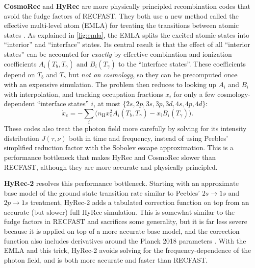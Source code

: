 \documentclass[USenglish, thumbmarks]{uiophdthesis} %
\newcommand\Hy{\ensuremath{\mathrm{H}}} %
\begin{document}
\textbf{CosmoRec} \cite{chlubaCompleteTreatmentCosmological2010} and
\textbf{HyRec} \cite{ali-haimoudHyRecFastHighly2011a}
are more physically principled recombination codes that avoid the fudge factors of RECFAST.
They both use a new method called the effective multi-level atom (EMLA)
for treating the transitions between atomic states
\cite{ali-haimoudUltrafastEffectiveMultilevel2010}.
As explained in \cref{fig:emla}, the EMLA splits the excited atomic states into \enquote{interior} and \enquote{interface} states.
Its central result is that the effect of all \enquote{interior states}
can be accounted for \emph{exactly} by effective combination and ionization coefficients $A_i(T_b, T_\gamma)$ and $B_i(T_\gamma)$
to the \enquote{interface states}.
These coefficients depend on $T_b$ and $T_\gamma$ but \emph{not on cosmology},
so they can be precomputed once with an expensive simulation.
The problem then reduces to looking up $A_i$ and $B_i$ with interpolation,
and tracking occupation fractions $x_i$ for only a few cosmology-dependent \enquote{interface states} $i$,
at most $\{2s, 2p, 3s, 3p, 3d, 4s, 4p, 4d\}$:
\begin{equation}
\dot{x}_e = -\sum_i \big( n_\Hy x_e^2 A_i(T_b, T_\gamma) - x_i B_i(T_\gamma) \big) .
\label{eq:hyrec}
\end{equation}
These codes also treat the photon field more carefully
by solving for its intensity distribution $J(\tau, \nu)$ both in time and frequency,
instead of using Peebles' simplified reduction factor with the Sobolev escape approximation.
This is a performance bottleneck that makes HyRec and CosmoRec slower than RECFAST,
although they are more accurate and physically principled.

\textbf{HyRec-2} \cite{leeHYREC2HighlyAccurate2020}
resolves this performance bottleneck.
Starting with an approximate base model of the ground state transition rate
similar to Peebles' $2s \to 1s$ and $2p \to 1s$ treatment,
HyRec-2 adds a tabulated correction function on top from an accurate (but slower) full HyRec simulation.
This is somewhat similar to the fudge factors in RECFAST and sacrifices some generality,
but it is far less severe because it is applied on top of a more accurate base model,
and the correction function also includes derivatives around the Planck 2018 parameters \cite{planck18parameters}.
With the EMLA and this trick, HyRec-2 avoids solving for the frequency-dependence of the photon field,
and is both more accurate and faster than RECFAST.
\end{document}

